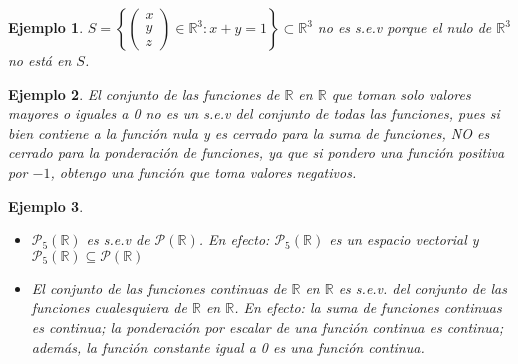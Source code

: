 \documentclass[12pt]{book}
\newtheorem{ejem}{Ejemplo}
\def\R{\mathbb{R}}
\def\P{\mathcal{P}}
\begin{document}
\vspace{0.5 cm}

\begin{ejem}{\em
$S=\left\{\left(\begin{array}{c}x\\y\\z\end{array}\right)\in\R^3: x+y=1\right\}\subset \R^3$ no es s.e.v  porque el nulo de $\R^3$ no est\'a en $S$.}
\end{ejem}
\begin{ejem}{\em
El conjunto de las funciones de $\R$ en $\R$ que toman solo valores mayores o iguales a 0 no es un s.e.v del conjunto de todas las funciones, pues si bien contiene a la función nula y es cerrado para la suma de funciones, NO es cerrado para la ponderación de funciones, ya que si pondero una función positiva por $-1$, obtengo una función que toma valores negativos.}
\end{ejem}
\begin{ejem}{\em
  \begin{itemize}
\item  $\P_5(\R)$ es s.e.v de $\P(\R)$. {\em En efecto: $\P_5(\R)$ es un espacio vectorial y $\P_5(\R)\subseteq \P(\R)$ }
\item  El conjunto de las funciones continuas de $\R$ en $\R$ es s.e.v. del conjunto de las funciones cualesquiera de $\R$ en $\R$. {\em En efecto: la suma de funciones continuas es continua; la ponderación por escalar de una función continua es continua; además, la función constante igual a 0 es una función continua.}
\end{itemize}}
\end{ejem}
\end{document}
